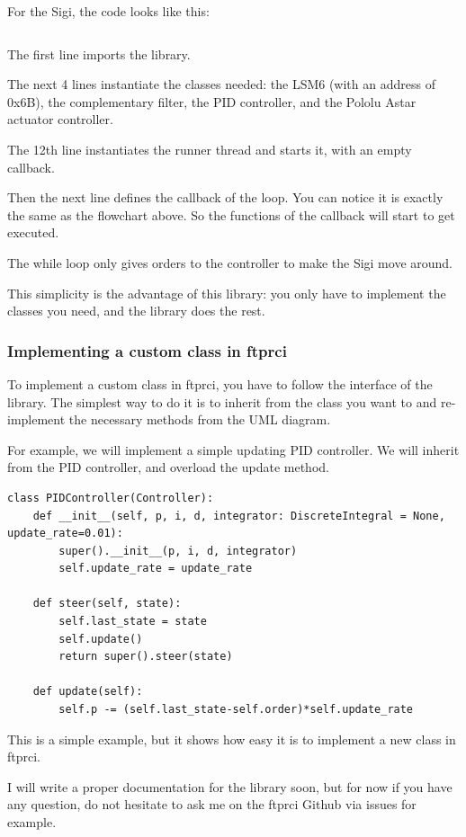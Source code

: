\documentclass{article}
\begin{document}
For the Sigi, the code looks like this:

\inputminted[linenos]{python3}{../main.py}

The first line imports the library.

The next 4 lines instantiate the classes needed: the LSM6 (with an address of 0x6B), the
complementary filter, the PID controller, and the Pololu Astar actuator controller.

The 12th line instantiates the runner thread and starts it, with an empty callback.

Then the next line defines the callback of the loop. You can notice it is exactly the same as the
flowchart above.
So the functions of the callback will start to get executed.

The while loop only gives orders to the controller to make the Sigi move around.

This simplicity is the advantage of this library: you only have to implement the classes you need,
and the library does the rest.

\subsubsection{Implementing a custom class in ftprci}

To implement a custom class in ftprci, you have to follow the interface of the library.
The simplest way to do it is to inherit from the class you want to and re-implement the necessary
methods from the UML diagram.

For example, we will implement a simple updating PID controller. We will inherit from the PID
controller, and overload the update method.

\begin{verbatim}
class PIDController(Controller):
    def __init__(self, p, i, d, integrator: DiscreteIntegral = None, update_rate=0.01):
        super().__init__(p, i, d, integrator)
        self.update_rate = update_rate

    def steer(self, state):
        self.last_state = state
        self.update()
        return super().steer(state)

    def update(self):
        self.p -= (self.last_state-self.order)*self.update_rate
\end{verbatim}

This is a simple example, but it shows how easy it is to implement a new class in ftprci.

I will write a proper documentation for the library soon, but for now if you have any question,
do not hesitate to ask me on the ftprci Github via issues for example.
\end{document}
